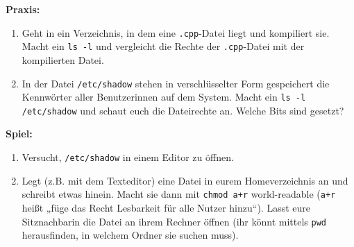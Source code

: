 \textbf{Praxis:}
\begin{enumerate}
    \item Geht in ein Verzeichnis, in dem eine \texttt{.cpp}-Datei liegt und
        kompiliert sie. Macht ein \texttt{ls -l} und vergleicht die Rechte der
        \texttt{.cpp}-Datei mit der kompilierten Datei.
    \item In der Datei \texttt{/etc/shadow} stehen in verschlüsselter Form
        gespeichert die Kennwörter aller Benutzerinnen auf dem System. Macht ein
        \texttt{ls -l /etc/shadow} und schaut euch die Dateirechte an. Welche
        Bits sind gesetzt?
\end{enumerate}

\textbf{Spiel:}
\begin{enumerate}
    \item Versucht, \texttt{/etc/shadow} in einem Editor zu öffnen.
    \item Legt (z.B. mit dem Texteditor) eine Datei in eurem Homeverzeichnis an
        und schreibt etwas hinein. Macht sie dann mit \texttt{chmod a+r}
        world-readable (\texttt{a+r} heißt „füge das Recht Lesbarkeit für alle
        Nutzer hinzu“). Lasst eure Sitznachbarin die Datei an ihrem Rechner
        öffnen (ihr könnt mittels \texttt{pwd} herausfinden, in welchem Ordner
        sie suchen muss).
\end{enumerate}
